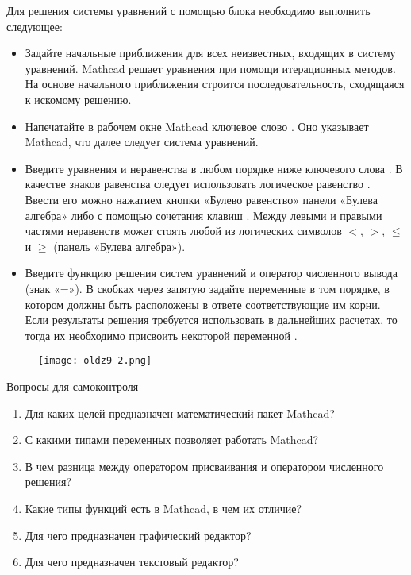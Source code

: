 Для решения системы уравнений с помощью блока  необходимо выполнить следующее:
\begin{itemize}
	\item Задайте начальные приближения для всех неизвестных, входящих в систему уравнений. Mathcad решает уравнения при помощи итерационных методов. На основе начального приближения строится последовательность, сходящаяся к искомому решению. 
	\item Напечатайте в рабочем окне Mathcad ключевое слово . Оно указывает Mathcad, что далее следует система уравнений.
	\item Введите уравнения и неравенства в любом порядке ниже ключевого слова . В качестве знаков равенства следует использовать логическое равенство . Ввести его можно нажатием кнопки «Булево равенство» панели «Булева алгебра» либо с помощью сочетания клавиш \keys{\ctrl+ =}. Между левыми и правыми частями неравенств может стоять любой из логических символов $<$, $>$, $\leqslant$ и $\geqslant$ (панель «Булева алгебра»).
	\item Введите функцию решения систем уравнений  и оператор численного вывода (знак «=»). В скобках через запятую задайте переменные в том порядке, в котором должны быть расположены в ответе соответствующие им корни. Если результаты решения требуется использовать в дальнейших расчетах, то тогда их необходимо присвоить некоторой переменной .
\end{itemize}

\begin{figure}[h]
	\begin{center}
		\texttt{[image: oldz9-2.png]}
	\end{center}
\end{figure}


Вопросы для самоконтроля
\begin{enumerate}
	\item Для каких целей предназначен математический пакет Mathcad?
	\item С какими типами переменных позволяет работать Mathcad?
	\item В чем разница между оператором присваивания и оператором численного решения?
	\item Какие типы функций есть в Mathcad, в чем их отличие?
	\item  Для чего предназначен графический редактор?
	\item Для чего предназначен текстовый редактор?
\end{enumerate}